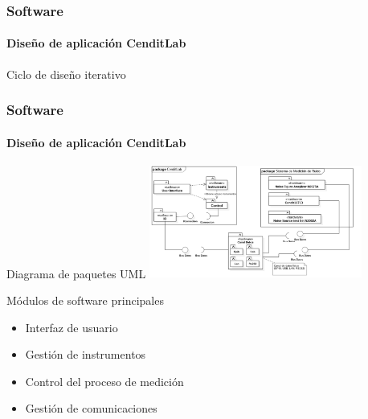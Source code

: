\documentclass[xcolor=pdftext, table]{beamer}
\begin{document}
	\begin{frame}

	\frametitle{Software}
		\framesubtitle{Diseño de aplicación CenditLab}
		
		\begin{block}{Ciclo de diseño iterativo}			
			\centering
		\end{block}	
	\end{frame}

	\begin{frame}
		\frametitle{Software}
		\framesubtitle{Diseño de aplicación CenditLab}		
		
		
		\begin{block}{Diagrama de paquetes UML}
			\centering
			\includegraphics[width=7cm]{Imagenes/MainPackagesUml.pdf}
		\end{block}						
		
		\begin{block}{Módulos de software principales}
			\begin{itemize}
				\tiny
				\item Interfaz de usuario
				\item Gestión de instrumentos
				\item Control del proceso de medición
				\item Gestión de comunicaciones
			\end{itemize}
		\end{block}
		
	\end{frame}
\end{document}
